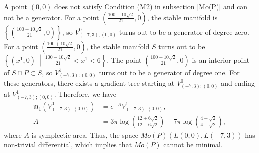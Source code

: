 \documentclass[12pt,reqno]{amsart}
\newcommand{\fm}{{\mathfrak{m}}}
\theoremstyle{definition}
\begin{document}
A point $(0,0)$ does not satisfy Condition (M2) in subsection \ref{Mo(P)} and can not be a generator. For a point $\left(\frac{100-10\sqrt{2}}{21},0\right)$, the stable manifold is $\left\{\left(\frac{100-10\sqrt{2}}{21},0\right)\right\}$, so $V_{(-7,3);(0,0)}^0$ turns out to be a generator of degree zero. For a point $\left(\frac{100+10\sqrt{2}}{21},0\right)$, the stable manifold $S$ turns out to be $\left\{\left(x^1,0\right)\ \middle|\ \frac{100-10\sqrt{2}}{21}<x^1<6\right\}$. The point $\left(\frac{100+10\sqrt{2}}{21},0\right)$ is an interior point of $S\cap P\subset S$, so $V_{(-7,3);(0,0)}^1$ turns out to be a generator of degree one. For these generators, there exists a gradient tree starting at $V_{(-7,3);(0,0)}^0$ and ending at $V_{(-7,3);(0,0)}^1$. Therefore, we have
\begin{equation*}
\begin{split}
\fm_1(V_{(-7,3);(0,0)}^0) &= e^{-A} V_{(-7,3);(0,0)}^1,\\
A &= 3\pi \log\left(\frac{12+6\sqrt{2}}{12-6\sqrt{2}}\right) - 7\pi \log\left(\frac{4+\sqrt{2}}{4-\sqrt{2}}\right),
\end{split}
\end{equation*}
where $A$ is symplectic area. Thus, the space $Mo(P)(L(0,0),L(-7,3))$ has non-trivial differential, which implies that $Mo(P)$ cannot be minimal.
\end{document}
